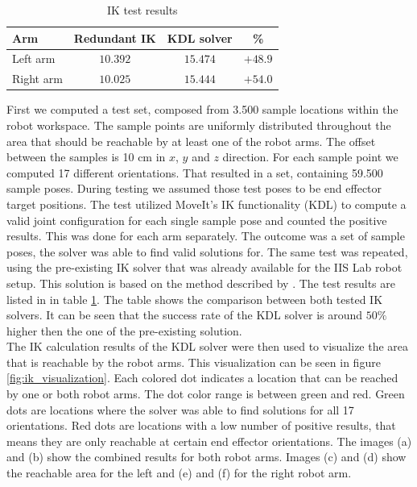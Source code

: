 \begin{table}[h]
  \centering
  \begin{tabular}[h]{|l|c|c|c|} \hline
	\textbf{Arm} & \textbf{Redundant IK} & \textbf{KDL solver} & \textbf{\%} \\ \hline
	Left arm & $10.392$ & $15.474$ & $+48.9$ \\
	Right arm & $10.025$ & $15.444$ & $+54.0$ \\ \hline
  \end{tabular}
  \caption{IK test results}
  \label{tbl:ik_results}
\end{table}

First we computed a test set, composed from 3.500 sample locations within the robot workspace. The sample points are uniformly distributed throughout the area that should be reachable by at least one of the robot arms. The offset between the samples is 10 cm in $x$, $y$ and $z$ direction. For each sample point we computed 17 different orientations. That resulted in a set, containing 59.500 sample poses. During testing we assumed those test poses to be end effector target positions. The test utilized MoveIt's IK functionality (KDL) to compute a valid joint configuration for each single sample pose and counted the positive results. This was done for each arm separately. The outcome was a set of sample poses, the solver was able to find valid solutions for. The same test was repeated, using the pre-existing IK solver that was already available for the IIS Lab robot setup. This solution is based on the method described by \citep{moore2010}. The test results are listed in in table \ref{tbl:ik_results}. The table shows the comparison between both tested IK solvers. It can be seen that the success rate of the KDL solver is around $50 \%$ higher then the one of the pre-existing solution. \\

The IK calculation results of the KDL solver were then used to visualize the area that is reachable by the robot arms. This visualization can be seen in figure \ref{fig:ik_visualization}. Each colored dot indicates a location that can be reached by one or both robot arms. The dot color range is between green and red. Green dots are locations where the solver was able to find solutions for all 17 orientations. Red dots are locations with a low number of positive results, that means they are only reachable at certain end effector orientations. The images (a) and (b) show the combined results for both robot arms. Images (c) and (d) show the reachable area for the left and (e) and (f) for the right robot arm.

